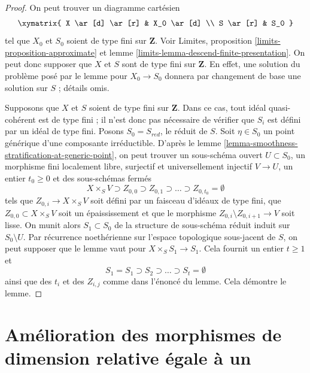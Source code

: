 \begin{proof}
On peut trouver un diagramme cartésien
$$
\xymatrix{
X \ar[d] \ar[r] & X_0 \ar[d] \\
S \ar[r] & S_0
}
$$
tel que $X_0$ et $S_0$ soient de type fini sur $\mathbf{Z}$. Voir
Limites, proposition \ref{limits-proposition-approximate} et
lemme \ref{limits-lemma-descend-finite-presentation}.
On peut donc supposer que $X$ et $S$ sont de type fini sur $\mathbf{Z}$.
En effet, une solution du problème posé par le lemme pour $X_0 \to S_0$
donnera par changement de base une solution sur $S$ ; détails omis.

\medskip\noindent
Supposons que $X$ et $S$ soient de type fini sur $\mathbf{Z}$.
Dans ce cas, tout idéal quasi-cohérent est de type fini ; il n'est donc
pas nécessaire de vérifier que $S_i$ est défini
par un idéal de type fini. Posons $S_0 = S_{red}$, le réduit de $S$.
Soit $\eta \in S_0$ un point générique d'une composante irréductible.
D'après le lemme \ref{lemma-smoothness-stratification-at-generic-point},
on peut trouver un sous-schéma ouvert $U \subset S_0$,
un morphisme fini localement libre, surjectif et universellement injectif
$V \to U$, un entier $t_0 \geq 0$ et des sous-schémas fermés
$$
X \times_S V \supset Z_{0, 0} \supset Z_{0, 1} \supset \ldots \supset
Z_{0, t_0} = \emptyset
$$
tels que $Z_{0, i} \to X \times_S V$ soit défini par un faisceau d'idéaux de type fini,
que $Z_{0, 0} \subset X \times_S V$ soit un épaississement et que le morphisme
$Z_{0, i} \setminus Z_{0, i + 1} \to V$ soit lisse.
On munit alors $S_1 \subset S_0$ de la structure de sous-schéma réduit induit
sur $S_0 \setminus U$. Par récurrence noethérienne sur l'espace
topologique sous-jacent de $S$, on peut supposer que le lemme vaut pour
$X \times_S S_1 \to S_1$. Cela fournit un entier $t \geq 1$ et
$$
S_1 = S_1 \supset S_2 \supset \ldots \supset S_t = \emptyset
$$
ainsi que des $t_i$ et des $Z_{i, j}$ comme dans l'énoncé du lemme.
Cela démontre le lemme.
\end{proof}


















\section{Amélioration des morphismes de dimension relative égale à un}
\label{section-make-good-curves}

